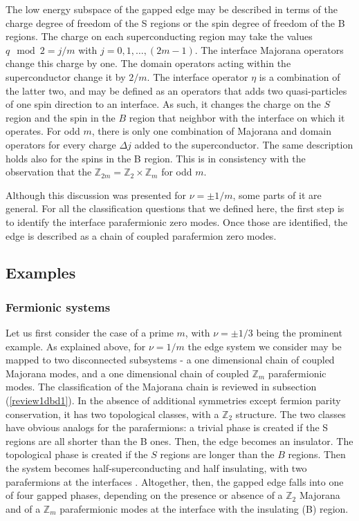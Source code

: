 \documentclass[twocolumn,aps,prb,showpacs]{revtex4-1}
\begin{document}
The low energy subspace of the gapped edge may be described in terms of the charge degree of freedom of the S regions or the spin degree of freedom of the B regions. The charge on each superconducting region may take the values $q\mod 2=j/m$ with $j=0,1,\dots,(2m-1)$. The interface Majorana operators change this charge by one. The domain operators acting within the superconductor change it by $2/m$. The interface operator $\eta$ is a combination of the latter two, and may be defined as an operators that adds two quasi-particles of one spin direction to an interface. As such, it changes the charge on the $S$ region and the spin in the $B$ region that neighbor with the interface on which it operates. For odd $m$, there is only one combination of Majorana and domain operators for every charge $\Delta j$ added to the superconductor. The same description holds also for the spins in the B region. This is in consistency with the observation that the $\mathbb{Z}_{2m}=\mathbb{Z}_2\times \mathbb{Z}_m$ for odd $m$.


Although this discussion was presented for $\nu=\pm 1/m$, some parts of it are general. For all the classification questions that we defined here, the first step is to identify the interface parafermionic zero modes. Once those are identified,
 the edge is described as a chain of coupled parafermion zero modes.








\subsection{Examples  \label{subs3}}
\subsubsection{Fermionic systems}\label{subs31}

Let us first consider the case of a prime $m$, with $\nu=\pm 1/3$ being the prominent example.
As explained above, for $\nu=1/m$ the edge system we consider may be mapped to two disconnected subsystems - a one dimensional chain of coupled Majorana modes, and a one dimensional chain of coupled $\mathbb{Z}_m$ parafermionic modes. The classification of the Majorana chain is reviewed in subsection (\ref{review1dbd1}). In the absence of additional symmetries except fermion parity conservation, it has two topological classes, with a $\mathbb{Z}_2$ structure.
The two classes have obvious analogs for the parafermions: a trivial phase is created if the S regions are all shorter than the B ones. Then, the edge becomes an insulator. The topological phase is created if the $S$ regions are longer than the $B$ regions. Then the system becomes half-superconducting and half insulating, with two parafermions at the interfaces \cite{Motruk2013}. Altogether, then, the gapped edge falls into one of  four gapped phases, depending on the presence or absence of a $\mathbb{Z}_2  $ Majorana  and of a $\mathbb{Z}_m$ parafermionic modes  at the interface with the insulating (B) region.
\end{document}
